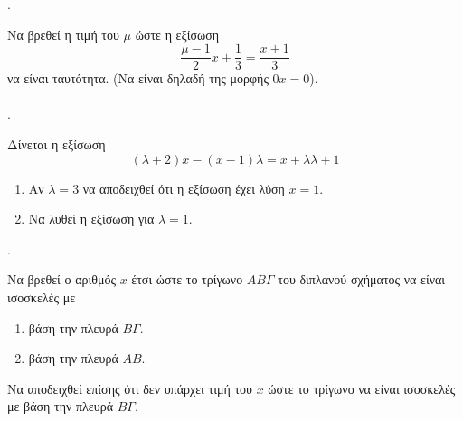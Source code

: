 \documentclass[11pt,a4paper,twocolumn]{article}
\newcounter{askhsh}
\newcommand{\askhsh}{\large\theaskhsh.\ \addtocounter{askhsh}{1}}
\begin{document}
\askhsh Να βρεθεί η τιμή του $ \mu $ ώστε η εξίσωση \[ \dfrac{\mu-1}{2}x+\dfrac{1}{3}=\dfrac{x+1}{3} \] να είναι ταυτότητα. (Να είναι δηλαδή της μορφής $ 0x=0 $).\\\\
\askhsh Δίνεται η εξίσωση \[ (\lambda+2)x-(x-1)\lambda=x+\lambda\lambda+1 \]
\begin{enumerate}[label=\roman*.,itemsep=0mm]
\item Αν $ \lambda=3 $ να αποδειχθεί ότι η εξίσωση έχει λύση $ x=1 $.
\item Να λυθεί η εξίσωση για $ \lambda=1 $.
\end{enumerate}
\askhsh Να βρεθεί ο αριθμός $ x $ έτσι ώστε το τρίγωνο $AB\varGamma$ του διπλανού σχήματος να είναι ισοσκελές με 
\begin{enumerate}[itemsep=0mm,label=\roman*.]
\item βάση την πλευρά $B\varGamma$.
\item βάση την πλευρά $AB$.
\end{enumerate}
Να αποδειχθεί επίσης ότι δεν υπάρχει τιμή του $x$ ώστε το τρίγωνο να είναι ισοσκελές με βάση την πλευρά $B\varGamma$.
\end{document}
